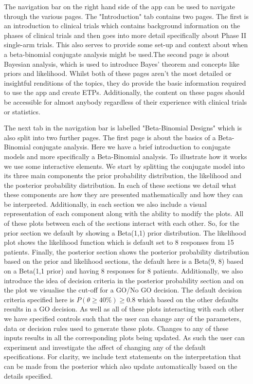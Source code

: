 The navigation bar on the right hand side of the app can be used to navigate through the various pages. The "Introduction" tab contains two pages. The first is an introduction to clinical trials which contains background information on the phases of clinical trials and then goes into more detail specifically about Phase \RN{2} single-arm trials. This also serves to provide some set-up and context about when a beta-binomial conjugate analysis might be used.The second page is about Bayesian analysis, which is used to introduce Bayes' theorem and concepts like priors and likelihood. Whilst both of these pages aren't the most detailed or insightful renditions of the topics, they do provide the basic information required to use the app and create ETPs. Additionally, the content on these pages should be accessible for almost anybody regardless of their experience with clinical trials or statistics. 

The next tab in the navigation bar is labelled "Beta-Binomial Designs" which is also split into two further pages. The first page is about the basics of a Beta-Binomial conjugate analysis. Here we have a brief introduction to conjugate models and more specifically a Beta-Binomial analysis. To illustrate how it works we use some interactive elements. We start by splitting the conjugate model into its three main components the prior probability distribution, the likelihood and the posterior probability distribution.  In each of these sections we detail what these components are how they are presented mathematically and how they can be interpreted. Additionally, in each section we also include a visual representation of each component along with the ability to modify the plots. All of these plots between each of the sections interact with each other. So, for the prior section we default by showing a Beta(1,1) prior distribution. The likelihood plot shows the likelihood function which is default set to 8 responses from 15 patients. Finally, the posterior section shows the posterior probability distribution based on the prior and likelihood sections, the default here is a Beta(9, 8) based on a Beta(1,1 prior) and having 8 responses for 8 patients. Additionally, we also introduce the idea of decision criteria in the posterior probability section and on the plot we visualise the cut-off for a GO/No GO decision. The default decision criteria specified here is $P(\theta  \geq 40\%) \geq 0.8$ which based on the other defaults results in a GO decision. As well as all of these plots interacting with each other we have specified controls such that the user can change any of the parameters, data or decision rules used to generate these plots. Changes to any of these inputs results in all the corresponding plots being updated. As such the user can experiment and investigate the affect of changing any of the default specifications. For clarity, we include text statements on the interpretation that can be made from the posterior which also update automatically based on the details specified.

